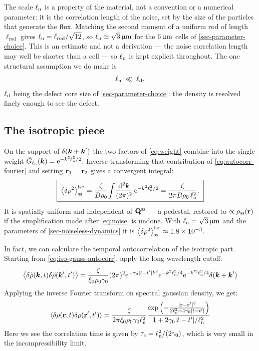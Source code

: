 \documentclass[a5paper]{article}
\begin{document}
The scale $\ell_{\rm n}$ is a property of the material, not a convention or a numerical parameter: it is the correlation length of the noise, set by the size of the particles that generate the flux. Matching the second moment of a uniform rod of length $\ell_\mathrm{rod}$ gives $\ell_{\rm n} = \ell_\mathrm{rod}/\sqrt{12}$, so $\ell_{\rm n}\simeq\sqrt3\,\upmu\mathrm{m}$ for the $6\,\upmu\mathrm{m}$ cells of \cref{sec-parameter-choice}. This is an estimate and not a derivation --- the noise correlation length may well be shorter than a cell --- so $\ell_{\rm n}$ is kept explicit throughout. The one structural assumption we do make is
\begin{equation}
    \label{eq:scale-separation}
    \ell_{\rm n} \;\ll\; \ell_{\rm d},
\end{equation}
$\ell_{\rm d}$ being the defect core size of \cref{sec-parameter-choice}: the density is resolved finely enough to see the defect.

\subsection{The isotropic piece}
\label{sec-iso}

On the support of $\delta(\boldsymbol{k}+\boldsymbol{k}')$ the two factors of \eqref{eq:weight} combine into the single weight $\tilde G_{\ell_{\rm n}}(\boldsymbol{k}) = \mathrm{e}^{-k^2\ell_{\rm n}^2/2}$. Inverse-transforming that contribution of \eqref{eq:autocorr-fourier} and setting $\mathbf{r}_1=\mathbf{r}_2$ gives a convergent integral:
\begin{equation}
    \label{eq:iso-gauss}
    \boxed{\;
    \left\langle\delta\rho^2\right\rangle^\mathrm{iso}_{\mathrm{ss}}
    = \frac{\zeta}{B\rho_0}\!\int\!\frac{\mathrm{d}^2\boldsymbol{k}}{(2\pi)^2}\,\mathrm{e}^{-k^2\ell_{\rm n}^2/2}
    = \frac{\zeta}{2\pi B\rho_0\,\ell_{\rm n}^2}.
    \;}
\end{equation}
It is spatially uniform and independent of $\mathbf{Q}^{\mathrm{ss}}$ --- a pedestal, restored to $\propto\rho_{\mathrm{ss}}(\mathbf{r})$ if the simplification made after \eqref{eq:noise} is undone. With $\ell_{\rm n} = \sqrt3\,\upmu\mathrm{m}$ and the parameters of \cref{sec-noiseless-dynamics} it is $\left\langle\delta\rho^2\right\rangle^\mathrm{iso}_{\mathrm{ss}} \approx 1.8\times10^{-3}$.

In fact, we can calculate the temporal autocorrelation of the isotropic part. Starting from \cref{eq:iso-gauss-autocorr}, apply the long wavelength cutoff:
\begin{align} 
    \left\langle\delta\tilde\rho(\boldsymbol{k},t)\delta\tilde\rho(\boldsymbol{k}',t')\right\rangle =
    \frac{\zeta}{\xi_0\rho_0\gamma_0} (2\pi)^2 \mathrm{e}^{-\gamma_0 |t-t'| k^2} \mathrm{e}^{-k^2 \ell_{\rm n}^2/4} 
    \mathrm{e}^{-k'^2 \ell_{\rm n}^2/4}
    \delta(\boldsymbol{k}+\boldsymbol{k}')
\end{align}
Applying the inverse Fourier transform on spectral gaussian density, we get:
\begin{align}
    \left\langle\delta\rho(\mathbf{r},t)\delta\rho(\mathbf{r}',t')\right\rangle =
    \frac{\zeta}{2\pi \xi_0\rho_0\gamma_0 \ell_{\rm n}^2} 
    \frac{
        \exp\left(-\frac{|\mathbf{r}-\mathbf{r}'|^2}{2 \ell_{\rm n}^2+4 \gamma_0 |t-t'|}\right)
        }{1 + 2 \gamma_0 |t-t'| / \ell_{\rm n}^2}
\end{align} 
Here we see the correlation time is given by $\tau_c = \ell_{\rm n}^2 / (2\gamma_0)$, which is very small in the incompressibility limit.
\end{document}
